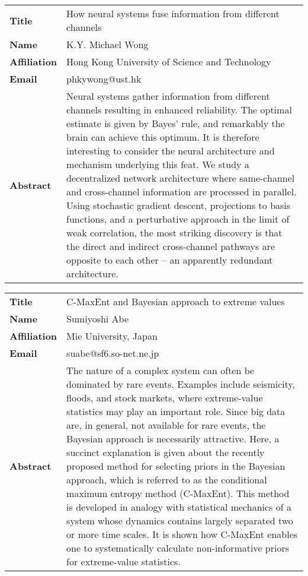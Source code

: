 \documentclass[oneside,A4paper,12pt]{article}
\begin{document}
\begin{longtable}{lp{14cm}}
\toprule
\textbf{Title} & How neural systems fuse information from different channels\\
\textbf{Name} & K.Y. Michael Wong\\
\textbf{Affiliation} & Hong Kong University of Science and Technology\\
\textbf{Email} & phkywong@ust.hk\\
\textbf{Abstract} & Neural systems gather information from different channels resulting in enhanced reliability. The optimal estimate is given by Bayes' rule, and remarkably the brain can achieve this optimum. It is therefore interesting to consider the neural architecture and mechanism underlying this feat. We study a decentralized network architecture where same-channel and cross-channel information are processed in parallel. Using stochastic gradient descent, projections to basis functions, and a perturbative approach in the limit of weak correlation, the most striking discovery is that the direct and indirect cross-channel pathways are opposite to each other -- an apparently redundant architecture.\\
\bottomrule
\end{longtable}

\newpage

\begin{longtable}{lp{14cm}}
\toprule
\textbf{Title} & C-MaxEnt and Bayesian approach to extreme values\\
\textbf{Name} & Sumiyoshi Abe\\
\textbf{Affiliation} & Mie University, Japan\\
\textbf{Email} & suabe@sf6.so-net.ne.jp\\
\textbf{Abstract} & The nature of a complex system can often be dominated by rare events. Examples include seismicity, floods, and stock markets, where extreme-value statistics may play an important role. Since big data are, in general, not available for rare events, the Bayesian approach is necessarily attractive. Here, a succinct explanation is given about the recently proposed method for selecting priors in the Bayesian approach, which is referred to as the conditional maximum entropy method (C-MaxEnt). This method is developed in analogy with statistical mechanics of a system whose dynamics contains largely separated two or more time scales. It is shown how C-MaxEnt enables one to systematically calculate non-informative priors for extreme-value statistics.\\
\bottomrule
\end{longtable}
\end{document}
